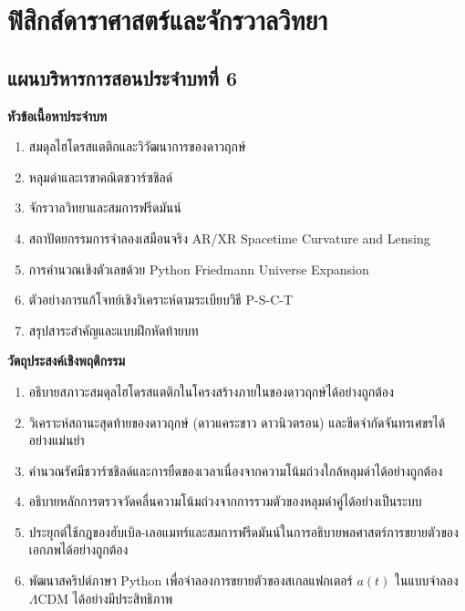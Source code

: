 \chapter{ฟิสิกส์ดาราศาสตร์และจักรวาลวิทยา}
\label{chap:astrophysics}

\section*{แผนบริหารการสอนประจำบทที่ 6}


\begin{lessonplanbox}
\noindent\textbf{หัวข้อเนื้อหาประจำบท}
\begin{enumerate}
    \item สมดุลไฮโดรสแตติกและวิวัฒนาการของดาวฤกษ์
    \item หลุมดำและเรขาคณิตชวาร์ซชิลด์
    \item จักรวาลวิทยาและสมการฟรีดมันน์
    \item สถาปัตยกรรมการจำลองเสมือนจริง AR/XR Spacetime Curvature and Lensing
    \item การคำนวณเชิงตัวเลขด้วย Python Friedmann Universe Expansion
    \item ตัวอย่างการแก้โจทย์เชิงวิเคราะห์ตามระเบียบวิธี P-S-C-T
    \item สรุปสาระสำคัญและแบบฝึกหัดท้ายบท
\end{enumerate}

\noindent\textbf{วัตถุประสงค์เชิงพฤติกรรม}
\begin{enumerate}
    \item อธิบายสภาวะสมดุลไฮโดรสแตติกในโครงสร้างภายในของดาวฤกษ์ได้อย่างถูกต้อง
    \item วิเคราะห์สถานะสุดท้ายของดาวฤกษ์ (ดาวแคระขาว ดาวนิวตรอน) และขีดจำกัดจันทรเศขรได้อย่างแม่นยำ
    \item คำนวณรัศมีชวาร์ซชิลด์และการยืดของเวลาเนื่องจากความโน้มถ่วงใกล้หลุมดำได้อย่างถูกต้อง
    \item อธิบายหลักการตรวจวัดคลื่นความโน้มถ่วงจากการรวมตัวของหลุมดำคู่ได้อย่างเป็นระบบ
    \item ประยุกต์ใช้กฎของฮับเบิล-เลอแมทร์และสมการฟรีดมันน์ในการอธิบายพลศาสตร์การขยายตัวของเอกภพได้อย่างถูกต้อง
    \item พัฒนาสคริปต์ภาษา Python เพื่อจำลองการขยายตัวของสเกลแฟกเตอร์ $a(t)$ ในแบบจำลอง $\Lambda\text{CDM}$ ได้อย่างมีประสิทธิภาพ
\end{enumerate}


\end{lessonplanbox}
